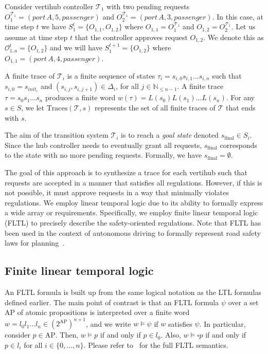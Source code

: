 \begin{eg}
Consider vertihub controller $\mathcal{T}_1$ with two pending requests $O^{\mathcal{T}_1}_1 = \left(port\, A, 5, passenger \right)$ and $O^{\mathcal{T}_1}_2= \left(port\, A, 3, passenger \right)$. In this case, at time step $t$ we have $S_1^t = \{O_{1,1},O_{1,2}\}$ where $O_{1,1} = O^{\mathcal{T}_1}_1$ and $O_{1,2} = O^{\mathcal{T}_1}_2$. Let us assume at time step $t$ that the controller approves request $O_{1,2}$. We denote this as $\mathcal{O}^{t}_{1,a} = \{O_{1,2} \}$ and we will have $S^{t+1}_1 = \{O_{1,2}\}$ where $ O_{1,1} = \left(port\, A, 4, passenger \right)$. 
\end{eg}


A finite trace of $\mathcal{T}_i$ is a finite sequence of states $\tau_i = s_{i,0} s_{i,1} \ldots s_{i,n}$ such that
$s_{i,0} = s_{\textit{init}_i}$ and $(s_{i,j}, s_{i,j+1}) \in \Delta_i$, for all $j \in \mathbb{N}_{\leq n-1}$.
A finite trace $\tau = s_0 s_1 \ldots s_n$ produces a finite word $w(\tau) = L(s_0) L(s_1) \ldots L(s_n)$. For any $s \in S$, we let $\text{Traces}(\mathcal{T}, s)$ represents the set of all finite traces of $\mathcal{T}$ that ends with $s$.

The aim of the transition system $\mathcal{T}_i$ is to reach a \emph{goal state} denoted $s_{\text{final}} \in S_i$. Since the hub controller needs to eventually grant all requests, $s_{\text{final}}$ corresponds to the state with no more pending requests. Formally, we have $s_{\text{final}} = \emptyset$.  

The goal of this approach is to synthesize a trace for each vertihub such that requests are accepted in a manner that satisfies all regulations. However, if this is not possible, it must approve requests in a way that minimally violates regulations. We employ linear temporal logic due to its ability to formally express a wide array or requirements. Specifically, we employ finite linear temporal logic (FLTL) to precisely describe the safety-oriented regulations. Note that FLTL has been used in the context of autonomous driving to formally represent road safety laws for planning~\cite{Tumova:2013:ACC,Tumova:2013:LCS}. 

\subsection{Finite linear temporal logic}
An FLTL formula is built up from the same logical notation as the LTL formulas defined earlier. The main point of contrast is that an FLTL formula $\psi$ over a set $\text{AP}$ of atomic propositions is interpreted over a finite word
$w = l_0 l_1 \ldots l_n \in (2^{\text{AP}})^{n+1}$,
and we write $w \models \psi$ if $w$ satisfies $\psi$.
In particular, consider $p \in \text{AP}$. Then,
$w \models p$ if and only if $p \in l_0$. Also,
$w \models \square p$
if and only if $p \in l_i$ for all $i \in \{0, \ldots, n\}$. Please refer to~\cite{gunter2002temporal} for the full FLTL semantics. 

